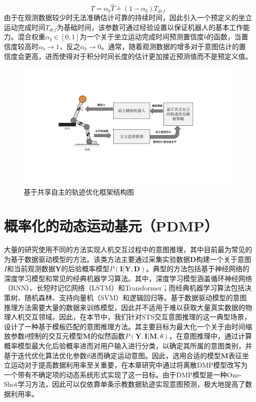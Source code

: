 \begin{equation}
    T=\alpha_b \hat T + (1-\alpha_b)T_{def}
    \label{eq:4-6}
\end{equation}
由于在观测数据较少时无法准确估计可靠的持续时间，因此引入一个预定义的坐立运动完成时间$T_{def}$为基础时间，该参数可通过经验设置以保证机器人的基本工作能力。混合权重$\alpha_b \in [0,1]$为一个关于坐立运动完成时间预测置信度$b$的函数，当置信度较高时$\alpha_b \rightarrow 1$，反之$\alpha_b \rightarrow 0$。通常，随着观测数据的增多对于意图估计的置信度会更高，进而使得对于积分时间长度的估计更加接近预测值而不是预定义值。

\begin{figure}[htb]
    \centering\includegraphics[width=1\textwidth]{figures/4-Fig-2.pdf}
    \caption{基于共享自主的轨迹优化框架结构图}
    \label{fig:4-2}
\end{figure}

\section{概率化的动态运动基元（PDMP）} 
大量的研究使用不同的方法实现人机交互过程中的意图推理，其中目前最为常见的为基于数据驱动模型的方法。该类方法主要通过采集实验数据$\mathbf{D}$构建一个关于意图$I$和当前观测数据$\mathbf{Y}$的后验概率模型$P(\mathbf{I}|\mathbf{Y},\mathbf{D})$。典型的方法包括基于神经网络的深度学习模型和常见的经典机器学习算法。其中，深度学习模型涵盖循环神经网络（RNN）、长短时记忆网络（LSTM）和Transformer；而经典机器学习算法包括决策树、随机森林、支持向量机（SVM）和逻辑回归等。基于数据驱动模型的意图推理方法需要大量的数据来训练模型，因此并不适用于难以获取大量真实数据的物理人机交互领域。因此，在本节中，我们针对STS交互意图推理的这一典型场景，设计了一种基于模板匹配的意图推理方法。其主要目标为最大化一个关于由时间缩放参数$\theta$控制的交互元模型$\mathbf{M}$的似然函数$P(\mathbf{Y},\mathbf{I}|\mathbf{M},\theta)$。在意图推理中，通过计算概率模型最大化后验概率进而对用户输入进行分类，以确定其所属的意图类别，并基于迭代优化算法优化参数$\theta$进而确定运动意图。因此，选用合适的模型$\mathbf{M}$表征坐立运动对于提高数据利用率至关重要，在本章研究中通过将离散DMP模型改写为一个带有不确定项的动态系统形式实现了这一目标。由于DMP模型是一种One-Shot学习方法，因此可以仅依靠单条示教数据轨迹实现意图预测，极大地提高了数据利用率。

